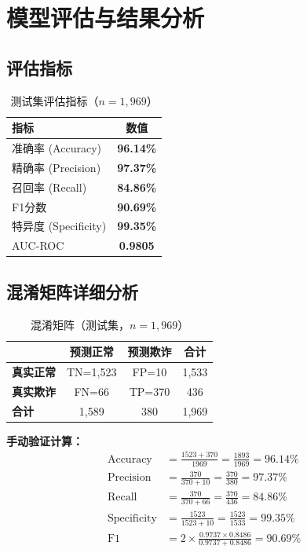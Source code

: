 \documentclass[12pt,a4paper]{article}
\begin{document}
\section{模型评估与结果分析}

\subsection{评估指标}

\begin{table}[H]
\centering
\caption{测试集评估指标（$n=1{,}969$）}
\label{tab:metrics}
\begin{tabular}{@{}lc@{}}
\toprule
\textbf{指标} & \textbf{数值} \\
\midrule
准确率 (Accuracy) & \textbf{96.14\%} \\
精确率 (Precision) & \textbf{97.37\%} \\
召回率 (Recall) & \textbf{84.86\%} \\
F1分数 & \textbf{90.69\%} \\
特异度 (Specificity) & \textbf{99.35\%} \\
AUC-ROC & \textbf{0.9805} \\
\bottomrule
\end{tabular}
\end{table}

\subsection{混淆矩阵详细分析}

\begin{table}[H]
\centering
\caption{混淆矩阵（测试集，$n=1{,}969$）}
\label{tab:cm}
\begin{tabular}{@{}lcc|c@{}}
\toprule
 & \textbf{预测正常} & \textbf{预测欺诈} & \textbf{合计} \\
\midrule
\textbf{真实正常} & TN=1{,}523 & FP=10 & 1{,}533 \\
\textbf{真实欺诈} & FN=66 & TP=370 & 436 \\
\midrule
\textbf{合计} & 1{,}589 & 380 & 1{,}969 \\
\bottomrule
\end{tabular}
\end{table}

\textbf{手动验证计算：}
\begin{align}
\text{Accuracy} & = \frac{1523 + 370}{1969} = \frac{1893}{1969} = 96.14\% \\
\text{Precision} & = \frac{370}{370 + 10} = \frac{370}{380} = 97.37\% \\
\text{Recall} & = \frac{370}{370 + 66} = \frac{370}{436} = 84.86\% \\
\text{Specificity} & = \frac{1523}{1523 + 10} = \frac{1523}{1533} = 99.35\% \\
\text{F1} & = 2 \times \frac{0.9737 \times 0.8486}{0.9737 + 0.8486} = 90.69\%
\end{align}
\end{document}
